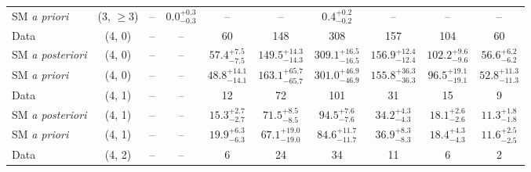 \begin{table}[h!]
{\begin{tabular}{lccccccccc}
    SM {\it a priori}     & (3, $\ge3$)      & --                            & $0.0^{+ 0.3 }_{- 0.3 }$       & --                          & --                          & $0.4^{+ 0.2 }_{- 0.2 }$     & --                          & --                         & --                         \\[0.5ex] 
    Data                  & (4, 0)           & --                            & --                            & 60                          & 148                         & 308                         & 157                         & 104                        & 60                         \\[0.5ex] 
    SM {\it a posteriori} & (4, 0)           & --                            & --                            & $57.4^{+ 7.5 }_{- 7.5 }$    & $149.5^{+ 14.3 }_{- 14.3 }$ & $309.1^{+ 16.5 }_{- 16.5 }$ & $156.9^{+ 12.4 }_{- 12.4 }$ & $102.2^{+ 9.6 }_{- 9.6 }$  & $56.6^{+ 6.2 }_{- 6.2 }$   \\[0.5ex] 
    SM {\it a priori}     & (4, 0)           & --                            & --                            & $48.8^{+ 14.1 }_{- 14.1 }$  & $163.1^{+ 65.7 }_{- 65.7 }$ & $301.0^{+ 46.9 }_{- 46.9 }$ & $155.8^{+ 36.3 }_{- 36.3 }$ & $96.5^{+ 19.1 }_{- 19.1 }$ & $52.8^{+ 11.3 }_{- 11.3 }$ \\[0.5ex] 
    Data                  & (4, 1)           & --                            & --                            & 12                          & 72                          & 101                         & 31                          & 15                         & 9                          \\[0.5ex] 
    SM {\it a posteriori} & (4, 1)           & --                            & --                            & $15.3^{+ 2.7 }_{- 2.7 }$    & $71.5^{+ 8.5 }_{- 8.5 }$    & $94.5^{+ 7.6 }_{- 7.6 }$    & $34.2^{+ 4.3 }_{- 4.3 }$    & $18.1^{+ 2.6 }_{- 2.6 }$   & $11.3^{+ 1.8 }_{- 1.8 }$   \\[0.5ex] 
    SM {\it a priori}     & (4, 1)           & --                            & --                            & $19.9^{+ 6.3 }_{- 6.3 }$    & $67.1^{+ 19.0 }_{- 19.0 }$  & $84.6^{+ 11.7 }_{- 11.7 }$  & $36.9^{+ 8.3 }_{- 8.3 }$    & $18.4^{+ 4.3 }_{- 4.3 }$   & $11.6^{+ 2.5 }_{- 2.5 }$   \\[0.5ex] 
    Data                  & (4, 2)           & --                            & --                            & 6                           & 24                          & 34                          & 11                          & 6                          & 2                          \\[0.5ex] 

\end{tabular}}
\end{table}
